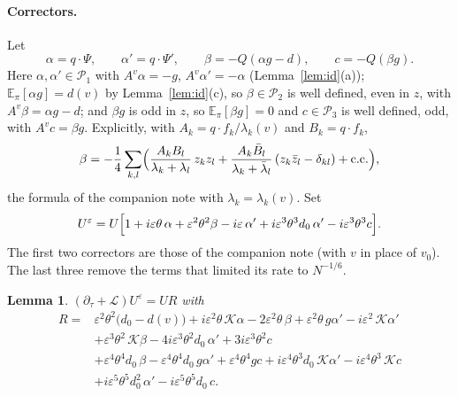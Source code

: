 \documentclass[11pt]{article}
\newcommand{\E}{\mathbb{E}}
\newcommand{\eps}{\varepsilon}
\newcommand{\cL}{\mathcal{L}}
\newcommand{\cK}{\mathcal{K}}
\newcommand{\cP}{\mathcal{P}}
\newtheorem{lemma}[theorem]{Lemma}
\theoremstyle{remark}
\begin{document}
\paragraph{Correctors.} Let
\[
  \alpha=q\cdot\Psi,\qquad\alpha'=q\cdot\Psi',\qquad
  \beta=-Q(\alpha g-d),\qquad c=-Q(\beta g).
\]
Here $\alpha,\alpha'\in\cP_1$ with $A^v\alpha=-g$, $A^v\alpha'=-\alpha$
(Lemma~\ref{lem:id}(a)); $\E_\pi[\alpha g]=d(v)$ by Lemma~\ref{lem:id}(c),
so $\beta\in\cP_2$ is well defined, even in $z$, with $A^v\beta=\alpha g-d$;
and $\beta g$ is odd in $z$, so $\E_\pi[\beta g]=0$ and $c\in\cP_3$ is well
defined, odd, with $A^vc=\beta g$. Explicitly, with
$A_k=q\cdot f_k/\lambda_k(v)$ and $B_k=q\cdot f_k$,
\[
  \beta=-\frac14\sum_{k,l}\Bigl(\frac{A_kB_l}{\lambda_k+\lambda_l}\,z_kz_l
   +\frac{A_k\bar B_l}{\lambda_k+\bar\lambda_l}\,(z_k\bar z_l-\delta_{kl})
   +\text{c.c.}\Bigr),
\]
the formula of the companion note with $\lambda_k=\lambda_k(v)$. Set
\begin{equation}
  U^\eps=U\Bigl[1+i\eps\theta\,\alpha+\eps^2\theta^2\beta
    -i\eps\,\alpha'+i\eps^3\theta^3d_0\,\alpha'-i\eps^3\theta^3c\Bigr].
\end{equation}
The first two correctors are those of the companion note (with $v$ in place
of $v_0$). The last three remove the terms that limited its rate to
$N^{-1/6}$.

\begin{lemma}\label{lem:rem}
$(\partial_\tau+\cL)U^\eps=UR$ with
\begin{align*}
  R={}&\eps^2\theta^2\bigl(d_0-d(v)\bigr)
     +i\eps^2\theta\,\cK\alpha-2\eps^2\theta\,\beta+\eps^2\theta\,g\alpha'
     -i\eps^2\,\cK\alpha' \\
   &+\eps^3\theta^2\,\cK\beta-4i\eps^3\theta^2d_0\,\alpha'+3i\eps^3\theta^2c \\
   &+\eps^4\theta^4d_0\,\beta-\eps^4\theta^4d_0\,g\alpha'+\eps^4\theta^4gc
     +i\eps^4\theta^3d_0\,\cK\alpha'-i\eps^4\theta^3\,\cK c \\
   &+i\eps^5\theta^5d_0^2\,\alpha'-i\eps^5\theta^5d_0\,c .
\end{align*}
\end{lemma}
\end{document}
